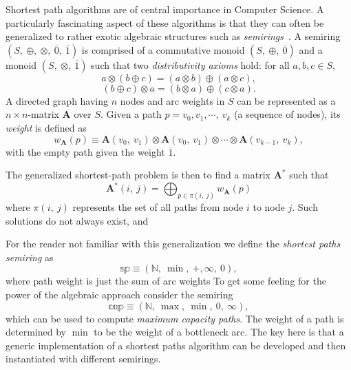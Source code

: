 Shortest path algorithms are of central importance in Computer Science.
A particularly fascinating aspect of these algorithms is
that they can often be generalized to rather exotic algebraic structures
such as \emph{semirings}~\cite{gondran_graphs_2008}.
A semiring $(S,\ \oplus,\ \otimes,\ \overline{0},\ \overline{1})$ is
comprised of a commutative monoid $(S,\ \oplus,\ \overline{0})$
and a monoid $(S,\ \otimes,\ \overline{1})$ such that
two \emph{distributivity axioms} hold:
for all $a, b, c \in S$,
\begin{equation}
\label{eq:left:distributivity}
    a\otimes (b \oplus c) = (a\otimes b) \oplus (a\otimes c),
\end{equation}
\begin{equation}
\label{eq:right:distributivity}
    (b \oplus c) \otimes a = (b\otimes a) \oplus (c\otimes a).
\end{equation}
A directed graph having $n$ nodes and arc weights in $S$
can be represented as a $n\times n$-matrix $\mathbf{A}$ over $S$.
Given a path $p = v_0, v_1, \cdots,\ v_k$ (a sequence of nodes),
its {\em weight} is defined as
\begin{equation}
\label{eq:def:weight}
    w_{\mathbf{A}}(p)
    \equiv
    \mathbf{A}(v_0,\ v_1)
    \otimes \mathbf{A}(v_0,\ v_1)
    \otimes \cdots
    \otimes \mathbf{A}(v_{k-1},\ v_k),
\end{equation}
with the empty path given the weight $\overline{1}$.

The generalized shortest-path problem is then to find
a matrix $\mathbf{A}^*$ such that
\begin{equation}
\label{eq:global}
\mathbf{A}^*(i,\ j) = \displaystyle\bigoplus_{p \in \pi(i,\ j)} w_{\mathbf{A}}(p)
\end{equation}
where $\pi(i,\ j)$ represents the set of all paths from node $i$ to node $j$.
Such solutions do not always exist, and 


For the reader not familiar with this generalization
we define the \emph{shortest paths semiring} as
\begin{equation}
\label{eq:def:sp}
\mathbb{sp} \equiv (\mathbb{N},\ \min,\ +, \infty,\ 0),
\end{equation}
where path weight is just the sum of arc weights
To get some feeling for the power of the
algebraic approach consider the semiring
\begin{equation}
\label{eq:def:cap}
\mathbb{cap} \equiv (\mathbb{N},\ \max,\ \min,\ 0,\ \infty),
\end{equation}
which can be used to compute \emph{maximum capacity paths}.
The weight of a path is determined by $\min$ to be the
weight of a bottleneck arc.
The key here is that a generic implementation of a shortest
paths algorithm can be developed and then instantiated with
different semirings.

